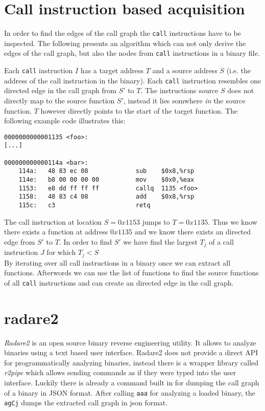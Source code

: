 \documentclass[
    12pt,                               %
    DIV=14,                     %
    parskip=half+,              %
    bigheadings,                %
    cleardoubleempty,   %
    halfparskip,                %
    ]{scrreprt} %
\begin{document}
\section{Call instruction based acquisition} \label{sec:graphfromcall}
In order to find the edges of the call graph the \verb'call' instructions have to be inspected. The following presents an algorithm which can not only derive the edges of the call graph, but also the nodes from \verb'call' instructions in a binary file.

Each \verb'call' instruction $I$ has a target address $T$ and a source address $S$ (i.e. the address of the call instruction in the binary). Each \verb'call' instruction resembles one directed edge in the call graph from $S'$ to $T$. The instructions source $S$ does not directly map to the source function $S'$, instead it lies somwhere \textit{in} the source function. $T$ however directly points to the start of the target function. The following example code illustrates this:
\begin{lstlisting}
0000000000001135 <foo>:
[...] 

000000000000114a <bar>:
    114a:	48 83 ec 08          	sub    $0x8,%rsp
    114e:	b8 00 00 00 00       	mov    $0x0,%eax
    1153:	e8 dd ff ff ff       	callq  1135 <foo>
    1158:	48 83 c4 08          	add    $0x8,%rsp
    115c:	c3                   	retq
\end{lstlisting}

The call instruction at location $S = 0x1153$ jumps to $T = 0x1135$. Thus we know there exists a function at address $0x1135$ and we know there exists an directed edge from $S'$ to $T$. In order to find $S'$ we have find the largest $T_j$ of a call instruction $J$ for which $T_j < S$ \\
By iterating over all call instructions in a binary once we can extract all functions. Afterwords we can use the list of functions to find the source functions of all \verb'call' instructions and can create an directed edge in the call graph.

\section{radare2} \label{sec:radare2}
\textit{Radare2} is an open source binary reverse engineering utility. It allows to analyze binaries using a text based user interface. Radare2 does not provide a direct API for programmatically analyzing binaries, instead there is a wrapper library called \textit{r2pipe} which allows sending commands as if they were typed into the user interface. Luckily there is already a command built in for dumping the call graph of a binary in JSON format. After calling \verb'aaa' for analyzing a loaded binary, the \verb'agCj' dumps the extracted call graph in json format.
\end{document}
